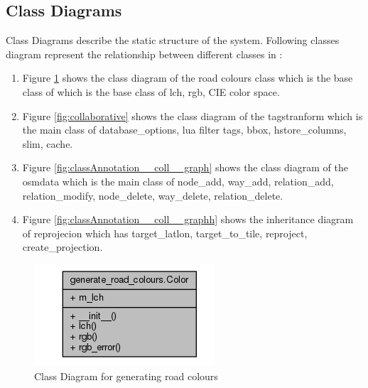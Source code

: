 \subsection{Class Diagrams}
Class Diagrams describe the static structure of the system. Following classes diagram represent the relationship between different classes in :
\begin{enumerate}
	\item Figure \ref{fig:collaborative1} shows the class diagram of the road colours class which is the base class of which is the base class of lch, rgb, CIE color space.

	\item Figure \ref{fig:collaborative} shows the class diagram of the tagstranform which is the main class of database\_options, lua filter tags, bbox, hstore\_columns, slim, cache.
	
	\item Figure \ref{fig:classAnnotation__coll__graph}  shows the class diagram of the osmdata which is the main class of node\_add, way\_add, relation\_add, relation\_modify, node\_delete, way\_delete, relation\_delete.

	\item Figure \ref{fig:classAnnotation__coll__graphh}  shows the inheritance diagram of reprojecion which has target\_latlon, target\_to\_tile, reproject, create\_projection.
\end{enumerate}

\begin{figure}
    \centering
    \includegraphics[scale=.85]{input/images/class_road.png}
    \caption{Class Diagram for generating road colours}
    \label{fig:collaborative1}
\end{figure}

